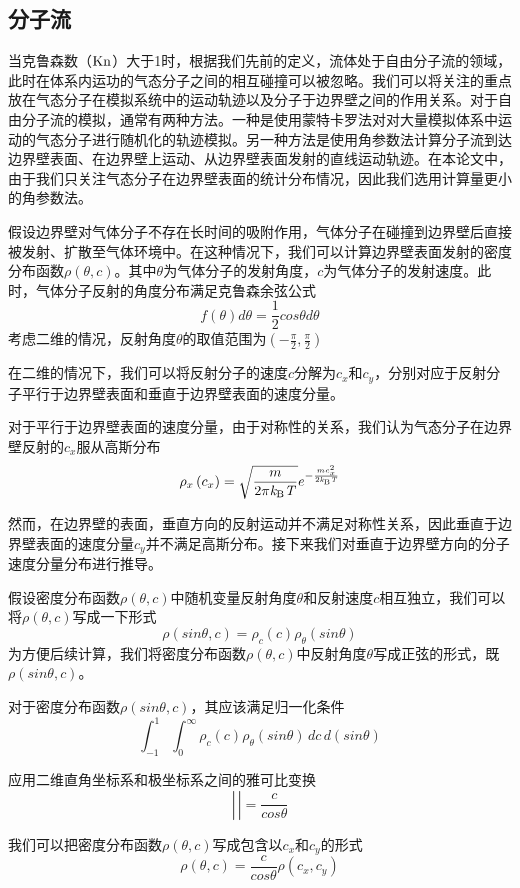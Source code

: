     \subsection{分子流}
    当克鲁森数（${\rm Kn}$）大于1时，根据我们先前的定义，流体处于自由分子流的领域，此时在体系内运功的气态分子之间的相互碰撞可以被忽略。我们可以将关注的重点放在气态分子在模拟系统中的运动轨迹以及分子于边界壁之间的作用关系。对于自由分子流的模拟，通常有两种方法。一种是使用蒙特卡罗法对对大量模拟体系中运动的气态分子进行随机化的轨迹模拟。另一种方法是使用角参数法计算分子流到达边界壁表面、在边界壁上运动、从边界壁表面发射的直线运动轨迹。在本论文中，由于我们只关注气态分子在边界壁表面的统计分布情况，因此我们选用计算量更小的角参数法。

    假设边界壁对气体分子不存在长时间的吸附作用，气体分子在碰撞到边界壁后直接被发射、扩散至气体环境中。在这种情况下，我们可以计算边界壁表面发射的密度分布函数$\rho\left(\theta, c\right)$。其中$\theta$为气体分子的发射角度，$c$为气体分子的发射速度。此时，气体分子反射的角度分布满足克鲁森余弦公式\chinesecolon
    \begin{equation}
        f\left(\theta\right)d\theta =\frac{1}{2}cos\theta d\theta 
    \end{equation}    
    考虑二维的情况，反射角度$\theta$的取值范围为$\left(-\frac{\pi}{2},\frac{\pi}{2}\right)$

    在二维的情况下，我们可以将反射分子的速度$c$分解为$c_x$和$c_y$，分别对应于反射分子平行于边界壁表面和垂直于边界壁表面的速度分量。

    对于平行于边界壁表面的速度分量，由于对称性的关系，我们认为气态分子在边界壁反射的$c_x$服从高斯分布\chinesecolon
    \[
        \rho_x\left(c_x\right)=\sqrt{\frac{m}{2\pi\it k_{\rm B} \it T}}e^{-\frac{mc_x^2}{2\it k_{\rm B} \it T}}
    \]

    然而，在边界壁的表面，垂直方向的反射运动并不满足对称性关系，因此垂直于边界壁表面的速度分量$c_y$并不满足高斯分布。接下来我们对垂直于边界壁方向的分子速度分量分布进行推导。

    假设密度分布函数$\rho\left(\theta, c\right)$中随机变量反射角度$\theta$和反射速度$c$相互独立，我们可以将$\rho\left(\theta, c\right)$写成一下形式\chinesecolon
    \[
        \rho\left(sin\theta,c\right)=\rho_c\left(c\right)\rho_\theta\left(sin\theta\right)
    \]
    为方便后续计算，我们将密度分布函数$\rho\left(\theta, c\right)$中反射角度$\theta$写成正弦的形式，既$\rho(sin\theta,c)$。
    
    对于密度分布函数$\rho\left(sin\theta,c\right)$，其应该满足归一化条件\chinesecolon
    \[
        \int_{-1}^{1} \int_{0}^{\infty}  \rho_c\left(c\right) \rho_\theta\left(sin\theta\right)\,dc  \,d\left(sin\theta\right) 
    \]

    应用二维直角坐标系和极坐标系之间的雅可比变换
    \[
        |\frac{}{}|=\frac{c}{cos\theta}
    \]

    我们可以把密度分布函数$\rho\left(\theta, c\right)$写成包含以$c_x$和$c_y$的形式
    \[
        \rho\left(\theta, c\right)=\frac{c}{cos\theta}\rho\left(c_x,c_y\right)
    \]